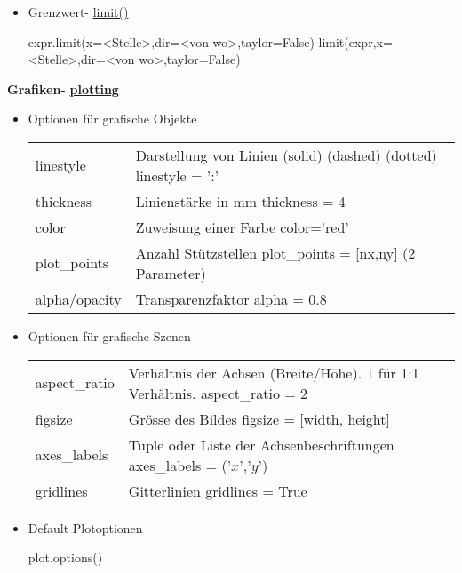 \documentclass[a4paper,9pt,DIV15]{scrartcl}
\begin{document}
\begin{itemize}
 \item Grenzwert- \href{https://sage.math.uni-goettingen.de/doc/static/reference/sage/calculus/functional.html?highlight=function#sage.calculus.functional.limit}{limit()}
\begin{sagein}
expr.limit(x=<Stelle>,dir=<von wo>,taylor=False)
limit(expr,x=<Stelle>,dir=<von wo>,taylor=False)
\end{sagein}
\end{itemize}
\pagebreak
\textbf{Grafiken- }	\href{https://sage.math.uni-goettingen.de/doc/static/reference/sage/plot/plot.html?highlight=.plot#d-plotting}{\textbf{plotting}}
\begin{itemize}
 \item Optionen für grafische Objekte\\
\begin{tabular}{lp{19cm}}
{linestyle}  & {Darstellung von Linien}
	{\isage{'-'} (solid)} {\isage{'-.'} (dashed)} {\isage{':'} (dotted)}
                {\color{blue} {linestyle = ':'}}\\
{thickness}  & Linienstärke in mm
              {\color{blue} {thickness = 4}}\\
{color}      & Zuweisung einer Farbe
              {\color{blue} {color='red'}}\\
							{plot\_points}        & {Anzahl Stützstellen}
							{\color{blue} {plot\_points  = [nx,ny]}} (2 Parameter)\\
{alpha/opacity}  & Transparenzfaktor
     {\color{blue} {alpha = 0.8}}\\
\end{tabular}
\item Optionen für grafische Szenen\\
\begin{tabular}{lp{19cm}}
	{aspect\_ratio} & Verhältnis der Achsen (Breite/Höhe). $1$ für 1:1 Verhältnis. 
	{\color{blue} {aspect\_ratio = 2}}\\
		{figsize}    & {Grösse des Bildes} 
							{{\color{blue} {figsize = [width, height]}}}\\          
{axes\_labels} &  Tuple oder Liste der Achsenbeschriftungen 
{\color{blue} {axes\_labels = ('$x$','$y$')}}\\
{gridlines} & Gitterlinien
              {\color{blue} {gridlines = True}}
\end{tabular}
\item Default Plotoptionen
	\begin{sagein}
plot.options()
	\end{sagein}


\end{itemize}
\end{document}
